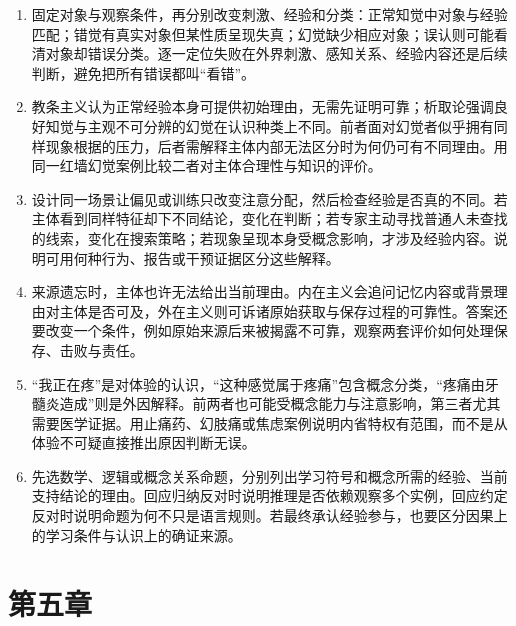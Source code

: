 \begin{enumerate}
\item 固定对象与观察条件，再分别改变刺激、经验和分类：正常知觉中对象与经验匹配；错觉有真实对象但某性质呈现失真；幻觉缺少相应对象；误认则可能看清对象却错误分类。逐一定位失败在外界刺激、感知关系、经验内容还是后续判断，避免把所有错误都叫“看错”。
\item 教条主义认为正常经验本身可提供初始理由，无需先证明可靠；析取论强调良好知觉与主观不可分辨的幻觉在认识种类上不同。前者面对幻觉者似乎拥有同样现象根据的压力，后者需解释主体内部无法区分时为何仍可有不同理由。用同一红墙幻觉案例比较二者对主体合理性与知识的评价。
\item 设计同一场景让偏见或训练只改变注意分配，然后检查经验是否真的不同。若主体看到同样特征却下不同结论，变化在判断；若专家主动寻找普通人未查找的线索，变化在搜索策略；若现象呈现本身受概念影响，才涉及经验内容。说明可用何种行为、报告或干预证据区分这些解释。
\item 来源遗忘时，主体也许无法给出当前理由。内在主义会追问记忆内容或背景理由对主体是否可及，外在主义则可诉诸原始获取与保存过程的可靠性。答案还要改变一个条件，例如原始来源后来被揭露不可靠，观察两套评价如何处理保存、击败与责任。
\item “我正在疼”是对体验的认识，“这种感觉属于疼痛”包含概念分类，“疼痛由牙髓炎造成”则是外因解释。前两者也可能受概念能力与注意影响，第三者尤其需要医学证据。用止痛药、幻肢痛或焦虑案例说明内省特权有范围，而不是从体验不可疑直接推出原因判断无误。
\item 先选数学、逻辑或概念关系命题，分别列出学习符号和概念所需的经验、当前支持结论的理由。回应归纳反对时说明推理是否依赖观察多个实例，回应约定反对时说明命题为何不只是语言规则。若最终承认经验参与，也要区分因果上的学习条件与认识上的确证来源。
\end{enumerate}

\section*{第五章}

